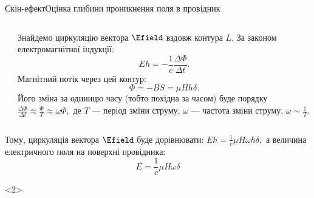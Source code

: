 \documentclass{beamer}
\begin{document}
\begin{frame}{Скін-ефект}{Оцінка глибини проникнення поля в провідник}
\begin{onlyenv}
\begin{columns}
\begin{column}{0.3\linewidth}
\begin{tikzpicture}[>=latex]
				\end{tikzpicture}
			\end{column}
			\begin{column}{0.7\linewidth}
				\begin{block}{}\justifying
					Знайдемо циркуляцію вектора \textcolor{red}{$\Efield$} вздовж контура \textcolor{green!60!black}{$L$}. За законом електромагнітної індукції:
					\begin{equation*}
						Eh = - \frac1c\frac{\Delta\Phi}{\Delta t}.
					\end{equation*}
					Магнітний потік через цей контур:
					\begin{equation*}
						\Phi = -BS = \mu H h \delta.
					\end{equation*}
					Його зміна за одиницю часу (тобто похідна за часом) буде порядку
					\(
					\frac{\Delta\Phi}{\Delta t} \approx \frac{\Phi}{T} \approx \omega \Phi,
					\)
					де $T$ --- період зміни струму, $\omega$ --- частота зміни струму, $\omega \sim \frac1T $.
				\end{block}
			\end{column}
		\end{columns}
		\begin{block}{}\justifying
			Тому, циркуляція вектора $\Efield$ буде дорівнювати:
			\(
			E h = \frac1c \mu H\omega h \delta,
			\) а величина електричного поля на поверхні провідника:
			\begin{equation*}
				E = \frac1c \mu H\omega \delta
			\end{equation*}
		\end{block}
	\end{onlyenv}
	\begin{onlyenv}
		\begin{columns}
			\begin{column}{0.3\linewidth}
\end{column}
\end{columns}
\end{onlyenv}
\end{frame}
\end{document}
